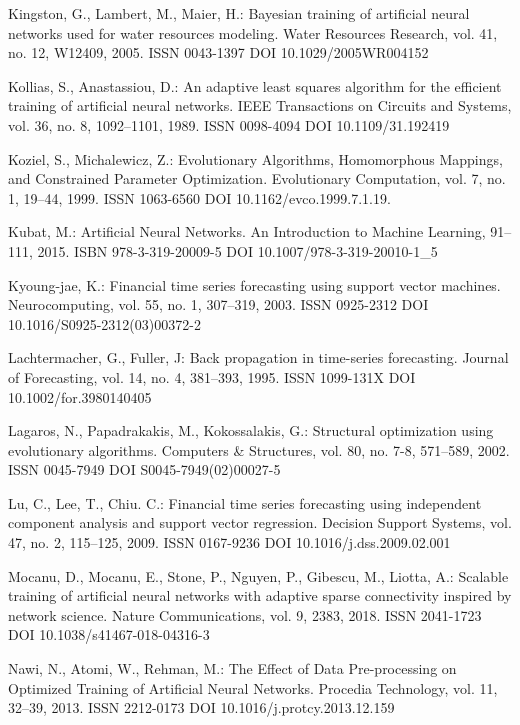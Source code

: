 \begin{thebibliography}{99.}
 Kingston, G., Lambert, M., Maier, H.: Bayesian training of artificial neural networks used for water resources modeling. Water Resources Research, vol. 41, no. 12, W12409, 2005. ISSN 0043-1397 DOI 10.1029/2005WR004152

 Kollias, S., Anastassiou, D.: An adaptive least squares algorithm for the efficient training of artificial neural networks. IEEE Transactions on Circuits and Systems, vol. 36, no. 8, 1092--1101, 1989. ISSN 0098-4094 DOI 10.1109/31.192419

 Koziel, S., Michalewicz, Z.: Evolutionary Algorithms, Homomorphous Mappings, and Constrained Parameter Optimization. Evolutionary Computation, vol. 7, no. 1, 19--44, 1999. ISSN 1063-6560 DOI 10.1162/evco.1999.7.1.19.

 Kubat, M.: Artificial Neural Networks. An Introduction to Machine Learning, 91--111, 2015. ISBN 978-3-319-20009-5 DOI 10.1007/978-3-319-20010-1\_5

 Kyoung-jae, K.: Financial time series forecasting using support vector machines. Neurocomputing, vol. 55, no. 1, 307--319, 2003. ISSN 0925-2312 DOI 10.1016/S0925-2312(03)00372-2

 Lachtermacher, G., Fuller, J: Back propagation in time-series forecasting. Journal of Forecasting, vol. 14, no. 4, 381--393, 1995. ISSN 1099-131X DOI 10.1002/for.3980140405

 Lagaros, N., Papadrakakis, M., Kokossalakis, G.: Structural optimization using evolutionary algorithms. Computers \& Structures, vol. 80, no. 7-8, 571--589, 2002. ISSN 0045-7949 DOI S0045-7949(02)00027-5

 Lu, C., Lee, T., Chiu. C.: Financial time series forecasting using independent component analysis and support vector regression. Decision Support Systems, vol. 47, no. 2, 115--125, 2009. ISSN 0167-9236 DOI 10.1016/j.dss.2009.02.001

 Mocanu, D., Mocanu, E., Stone, P., Nguyen, P., Gibescu, M., Liotta, A.: Scalable training of artificial neural networks with adaptive sparse connectivity inspired by network science. Nature Communications, vol. 9, 2383, 2018. ISSN 2041-1723 DOI 10.1038/s41467-018-04316-3

 Nawi, N., Atomi, W., Rehman, M.: The Effect of Data Pre-processing on Optimized Training of Artificial Neural Networks. Procedia Technology, vol. 11, 32--39, 2013. ISSN 2212-0173 DOI 10.1016/j.protcy.2013.12.159


\end{thebibliography}

